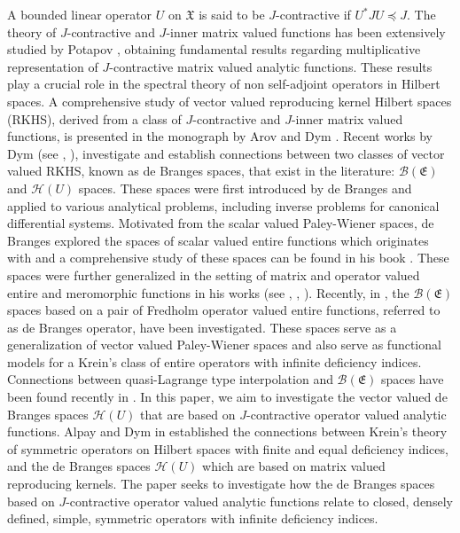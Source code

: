 \documentclass [12pt,reqno]{amsart}
\numberwithin{equation}{subsection}
\numberwithin{equation}{section}
\begin{document}
A bounded linear operator \( U \) on \(\mathfrak{X}\) is said to be \( J \)-contractive if \( U^*JU \preceq J \). The theory of \( J \)-contractive and \( J \)-inner matrix valued functions has been extensively studied by Potapov \cite{Potapov1}, obtaining fundamental results regarding multiplicative representation of $J$-contractive matrix valued analytic functions. These results play a crucial role in the spectral theory of non self-adjoint operators in Hilbert spaces. A comprehensive study of vector valued reproducing kernel Hilbert spaces (RKHS), derived from a class of \( J \)-contractive and \( J \)-inner matrix valued functions, is presented in the monograph by Arov and Dym \cite{ArD08}. Recent works by Dym (see \cite{DymJFA}, \cite{ArDymone}), investigate and establish connections between two classes of vector valued RKHS, known as de Branges spaces, that exist in the literature: \(\mathcal{B}(\mathfrak{E})\) and \( \mathcal{H}(U) \) spaces. These spaces were first introduced by de Branges and applied to various analytical problems, including inverse problems for canonical differential systems. Motivated from the scalar valued Paley-Wiener spaces, de Branges explored the spaces of scalar valued entire functions which originates with \cite{brange} and a comprehensive study of these spaces can be found in his book \cite{Brange}. These spaces were further generalized in the setting of matrix and operator valued entire and meromorphic functions in his works (see \cite{Branges 1}, \cite{Branges 2}, \cite{Branges 3}). Recently, in \cite{mahapatra}, the \( \mathcal{B}(\mathfrak{E}) \) spaces based on a pair of Fredholm operator valued entire functions, referred to as de Branges operator, have been investigated. These spaces serve as a generalization of vector valued Paley-Wiener spaces and also serve as functional models for a Krein's class of entire operators with infinite deficiency indices. Connections between quasi-Lagrange type interpolation and \( \mathcal{B}(\mathfrak{E}) \) spaces have been found recently in \cite{mahapatra3}. In this paper, we aim to investigate the vector valued de Branges spaces $\mathcal{H}(U)$ that are based on $J$-contractive operator valued analytic functions. Alpay and Dym in \cite{alpay} established the connections between Krein's theory of symmetric operators on Hilbert spaces with finite and equal deficiency indices, and the de Branges spaces $\mathcal{H}(U)$ which are based on matrix valued reproducing kernels. The paper seeks to investigate how the de Branges spaces based on $J$-contractive operator valued analytic functions relate to closed, densely defined, simple, symmetric operators with infinite deficiency indices.
\end{document}
